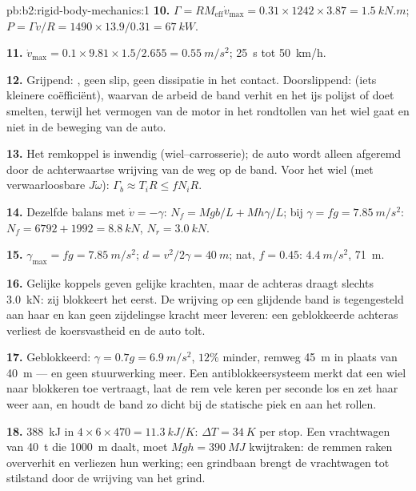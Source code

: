 \begin{solution}{pb:b2:rigid-body-mechanics:1}
\textbf{10.}
$\Gamma = RM_{\text{eff}}\dot v_{\max} = 0.31 \times 1242 \times 3.87 =
\qty{1.5}{kN.m}$;
$P = \Gamma v/R = 1490 \times 13.9/0.31 = \qty{67}{kW}$.

\textbf{11.}
$\dot v_{\max} = 0.1 \times 9.81 \times 1.5/2.655 = \qty{0.55}{m/s^2}$;
\qty{25}{s} tot \qty{50}{km/h}.

\textbf{12.} Grijpend: , geen slip, geen dissipatie in het
contact. Doorslippend:  (iets kleinere coëfficiënt),
waarvan de arbeid de band verhit en het ijs polijst of doet smelten, terwijl
het vermogen van de motor in het rondtollen van het wiel gaat en niet in de
beweging van de auto.

\textbf{13.} Het remkoppel is inwendig (wiel--carrosserie); de auto wordt
alleen afgeremd door de achterwaartse wrijving van de weg op de band. Voor
het wiel (met verwaarloosbare $J\dot\omega$):
$\Gamma_b \approx T_iR \le fN_iR$.

\textbf{14.} Dezelfde balans met $\dot v = -\gamma$:
$N_f = Mgb/L + Mh\gamma/L$; bij $\gamma = fg = \qty{7.85}{m/s^2}$:
$N_f = 6792 + 1992 = \qty{8.8}{kN}$, $N_r =
\qty{3.0}{kN}$.

\textbf{15.} $\gamma_{\max} = fg = \qty{7.85}{m/s^2}$;
$d = v^2/2\gamma = \qty{40}{m}$; nat, $f = 0.45$: $\qty{4.4}{m/s^2}$,
\qty{71}{m}.

\textbf{16.} Gelijke koppels geven gelijke krachten, maar de achteras draagt
slechts \qty{3.0}{kN}: zij blokkeert het eerst. De wrijving op een glijdende
band is tegengesteld aan haar  en kan geen zijdelingse kracht
meer leveren: een geblokkeerde achteras verliest de koersvastheid en de auto
tolt.

\textbf{17.} Geblokkeerd: $\gamma = 0.7g = \qty{6.9}{m/s^2}$, $12\%$ minder,
remweg \qty{45}{m} in plaats van \qty{40}{m} --- en geen stuurwerking meer.
Een antiblokkeersysteem merkt dat een wiel naar blokkeren toe vertraagt,
laat de rem vele keren per seconde los en zet haar weer aan, en houdt de
band zo dicht bij de statische piek en aan het rollen.

\textbf{18.} \qty{388}{kJ} in $4 \times 6 \times 470 = \qty{11.3}{kJ/K}$:
$\Delta T =
\qty{34}{K}$ per stop. Een vrachtwagen van \qty{40}{t} die
\qty{1000}{m} daalt, moet $Mgh = \qty{390}{MJ}$ kwijtraken: de remmen raken
oververhit en verliezen hun werking; een grindbaan brengt de vrachtwagen tot
stilstand door de wrijving van het grind.


\end{solution}
